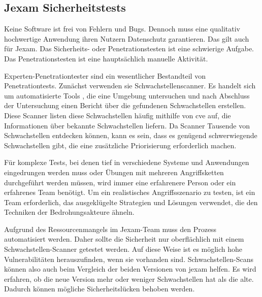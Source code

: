 \subsection{Jexam Sicherheitstests}

Keine Software ist frei von Fehlern und Bugs. Dennoch muss eine qualitativ
hochwertige Anwendung ihren Nutzern Datenschutz garantieren. Das gilt
auch f\"ur Jexam. Das Sicherheits- oder Penetrationstesten  ist eine schwierige
Aufgabe. Das Penetrationstesten ist eine haupts\"achlich manuelle Aktivit\"at.

Experten-Penetrationtester sind ein wesentlicher Bestandteil
von Penetrationtests. Zunächst verwenden sie Schwachstellenscanner.
Es handelt sich um automatisierte Tools , die eine Umgebung untersuchen
und nach Abschluss der Untersuchung einen Bericht über die
gefundenen Schwachstellen erstellen. Diese Scanner listen diese
Schwachstellen häufig mithilfe von \Gls{cve} auf, die Informationen
über bekannte Schwachstellen liefern. Da Scanner Tausende von
Schwachstellen entdecken können, kann es sein, dass es
genügend schwerwiegende Schwachstellen gibt, die eine zusätzliche
Priorisierung erforderlich machen.


Für komplexe Tests, bei denen tief in verschiedene Systeme und
Anwendungen eingedrungen werden muss oder Übungen mit mehreren
Angriffsketten durchgeführt werden müssen, wird immer eine
erfahrenere Person oder ein erfahrenes Team benötigt. Um ein
realistisches Angriffsszenario zu testen, ist ein Team erforderlich,
das ausgeklügelte Strategien und Lösungen verwendet, die den
Techniken der Bedrohungsakteure ähneln.


Aufgrund des Ressourcenmangels im Jexam-Team muss den Prozess
automatisiert werden.  Daher sollte die Sicherheit nur
oberflächlich mit einem Schwachstellen-Scanner getestet werden.
Auf diese Weise ist es möglich hohe Vulnerabilitäten
herauszufinden, wenn sie vorhanden sind. Schwachstellen-Scans
können also auch beim Vergleich der beiden Versionen von jexam
helfen. Es wird erfahren, ob die neue Version mehr oder weniger
Schwachstellen hat als die alte. Dadurch können mögliche
Sicherheitslücken behoben werden.